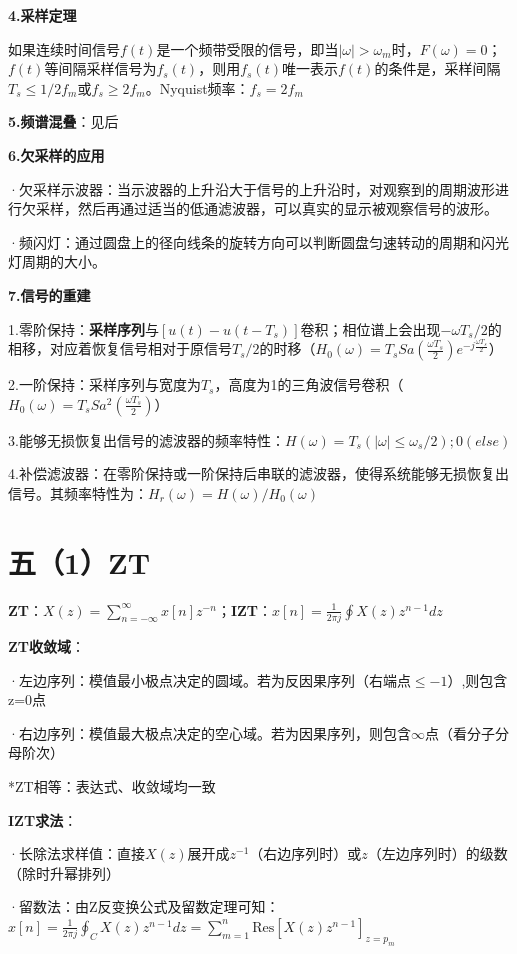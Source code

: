 \textbf{4.采样定理}

如果连续时间信号$f(t)$是一个频带受限的信号，即当$|\omega|>\omega_{m}$时，$F(\omega)=0$；$f(t)$等间隔采样信号为$f_{s}(t)$，则用$f_{s}(t)$唯一表示$f(t)$的条件是，采样间隔$T_{s}\leq 1/2f_{m}$或$f_{s}\geq 2f_{m}$。Nyquist频率：$f_{s}=2f_{m}$

\textbf{5.频谱混叠}：见后

\textbf{6.欠采样的应用}

·欠采样示波器：当示波器的上升沿大于信号的上升沿时，对观察到的周期波形进行欠采样，然后再通过适当的低通滤波器，可以真实的显示被观察信号的波形。

·频闪灯：通过圆盘上的径向线条的旋转方向可以判断圆盘匀速转动的周期和闪光灯周期的大小。

\textbf{7.信号的重建}

1.零阶保持：\textbf{采样序列}与$[u(t)-u(t-T_s)]$卷积；相位谱上会出现$-\omega T_s/2$的相移，对应着恢复信号相对于原信号$T_s/2$的时移（$H_0(\omega)=T_sSa(\frac{\omega T_s}{2})e^{-j\frac{\omega T_s}{2}}$）

2.一阶保持：采样序列与宽度为$T_s$，高度为1的三角波信号卷积（$H_0(\omega)=T_sSa^2(\frac{\omega T_s}{2})$）

3.能够无损恢复出信号的滤波器的频率特性：$H(\omega)=T_s(|\omega|\leq\omega_s/2);0(else)$

4.补偿滤波器：在零阶保持或一阶保持后串联的滤波器，使得系统能够无损恢复出信号。其频率特性为：$H_r(\omega)=H(\omega)/H_0(\omega)$

\section*{五（1）ZT}

\textbf{ZT}：$X(z)= \sum\limits_{n=-\infty}^{\infty}x[n]z^{-n}$；\textbf{IZT}：$x[n]= \frac{1}{2\pi j}\oint X(z)z^{n-1}dz$

\textbf{ZT收敛域}：

·左边序列：模值最小极点决定的圆域。若为反因果序列（右端点$\leq-1$）,则包含z=0点

·右边序列：模值最大极点决定的空心域。若为因果序列，则包含$\infty$点（看分子分母阶次）

*ZT相等：表达式、收敛域均一致

\textbf{IZT求法}：

·长除法求样值：直接$X(z)$展开成$z^{-1}$（右边序列时）或$z$（左边序列时）的级数（除时升幂排列）

·留数法：由Z反变换公式及留数定理可知：$x[n]=\tfrac{1}{2\pi j}\oint_C\!X(z)z^{n-1}dz=\sum_{m=1}^n\text{Res}[X(z)z^{n-1}]_{z=p_m}$

